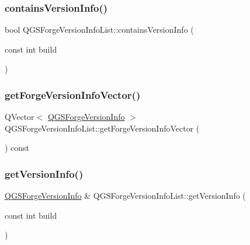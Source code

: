 \subsubsection{\texorpdfstring{contains\+Version\+Info()}{containsVersionInfo()}}
{\footnotesize\ttfamily bool Q\+G\+S\+Forge\+Version\+Info\+List\+::contains\+Version\+Info (\begin{DoxyParamCaption}\item[{const int}]{build }\end{DoxyParamCaption})}

\mbox{\label{class_q_g_s_forge_version_info_list_ae30186ae3a36a33d2e73191016c58e5e}} 
\subsubsection{\texorpdfstring{get\+Forge\+Version\+Info\+Vector()}{getForgeVersionInfoVector()}}
{\footnotesize\ttfamily Q\+Vector$<$ \mbox{\hyperlink{class_q_g_s_forge_version_info}{Q\+G\+S\+Forge\+Version\+Info}} $>$ Q\+G\+S\+Forge\+Version\+Info\+List\+::get\+Forge\+Version\+Info\+Vector (\begin{DoxyParamCaption}{ }\end{DoxyParamCaption}) const}

\mbox{\label{class_q_g_s_forge_version_info_list_aa55cd3a0e70ff3b5669bb58747b86af8}} 
\subsubsection{\texorpdfstring{get\+Version\+Info()}{getVersionInfo()}}
{\footnotesize\ttfamily \mbox{\hyperlink{class_q_g_s_forge_version_info}{Q\+G\+S\+Forge\+Version\+Info}} \& Q\+G\+S\+Forge\+Version\+Info\+List\+::get\+Version\+Info (\begin{DoxyParamCaption}\item[{const int}]{build }\end{DoxyParamCaption})}

